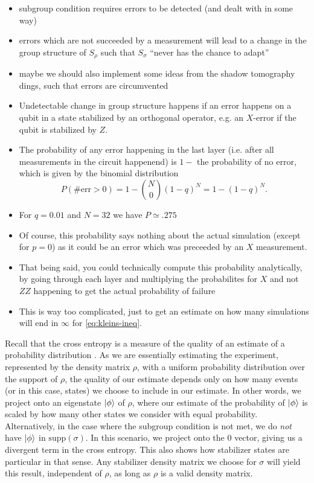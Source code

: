 \begin{itemize}
  \item subgroup condition requires errors to be detected (and dealt with in
    some way)
  \item errors which are not succeeded by a measurement will lead to a change
    in the group structure of $S_\rho$ such that $S_\sigma$ \enquote{never has
    the chance to adapt}
  \item maybe we should also implement some ideas from the shadow tomography
    dings, such that errors are circumvented
  \item Undetectable change in group structure happens if an error happens on a
    qubit in a state stabilized by an orthogonal operator, e.g. an $X$-error if
    the qubit is stabilized by $Z$.
  \item The probability of any error happening in the last layer (i.e. after
    all measurements in the circuit happenend) is $1-$ the probability of no
    error, which is given by the binomial distribution
    \[ P(\#\mathrm{err}>0) = 1-\binom{N}{0} (1-q)^N=1-(1-q)^N. \]
  \item For $q=\num{0.01}$ and $N=32$ we have $P\simeq .275$
  \item Of course, this probability says nothing about the actual simulation
    (except for $p=0$) as it could be an error which was preceeded by an $X$
    measurement.
  \item That being said, you could technically compute this probability
    analytically, by going through each layer and multiplying the probabilites
    for \(X\) and not $ZZ$ happening to get the actual probability of failure
   \item This is way too complicated, just to get an estimate on how many
     simulations will end in $\infty$ for \cref{eq:kleins-ineq}. 
\end{itemize}

Recall that the cross entropy is a measure of the quality of an estimate of a
probability distribution \cite{coverElementsInformationTheory2006}. As we are
essentially estimating the experiment, represented by the density matrix
$\rho$, with a uniform probability distribution over the support of $\rho$, the
quality of our estimate depends only on how many events (or in this case,
states) we choose to include in our estimate. In other words, we project onto
an eigenstate $\ket{\phi}$ of $\rho$, where our estimate of the probability of
$\ket{\phi}$ is scaled by how many other states we consider with equal
probability. Alternatively, in the case where the subgroup condition is not
met, we do \emph{not} have $\ket{\phi}$ in $\mathrm{supp}\left( \sigma
\right)$. In this scenario, we project onto the $0$ vector, giving us a
divergent term in the cross entropy.
This also shows how stabilizer
states are particular in that sense. Any stabilizer density matrix we choose
for $\sigma$ will yield this result, independent of $\rho$, as long as $\rho$
is a valid density matrix. 
